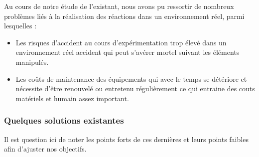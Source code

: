 Au cours de notre étude de l’existant, nous avons pu ressortir de nombreux problèmes liés à la réalisation des réactions dans un environnement réel, parmi lesquelles :

\begin{itemize}
	\item Les risques d’accident au cours d’expérimentation trop élevé dans un environnement réel accident qui peut s’avérer mortel suivant les éléments manipulés.
	\item Les coûts de maintenance des équipements qui avec le temps se détériore et nécessite d’être renouvelé ou entretenu régulièrement ce qui entraine des couts matériels et humain assez important.
\end{itemize}

\subsubsection{Quelques solutions existantes}

Il est question ici de noter les points forts de ces dernières et leurs points faibles afin d’ajuster nos objectifs.

